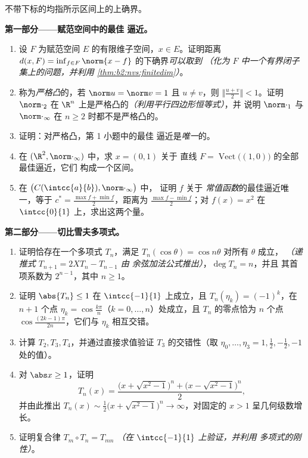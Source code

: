 \begin{problem}
\label{pb:b2:nvs:1}
不带下标的均指所示区间上的上确界。

\medskip
\noindent\textbf{第一部分——赋范空间中的最佳
逼近。}
\begin{enumerate}
  \item 设 $F$ 为赋范空间
        $E$ 的有限维子空间，$x \in E$。证明距离 $d(x,
        F) = \inf_{f \in F}\norm{x - f}$ 的下确界\emph{可以取到}
        \emph{（化为 $F$ 中一个有界闭子集上的问题，并利用
        \cref{thm:b2:nvs:finitedim}）}。
  \item 称为\emph{严格凸}的，若 $\norm u = \norm v
        = 1$ 且 $u \neq v$，则 $\bigl\Vert\frac{u +
        v}2\bigr\Vert < 1$。证明 $\norm\cdot_2$ 在 $\R^n$
        上是严格凸的\emph{（利用平行四边形恒等式）}，并
        说明 $\norm\cdot_1$ 与 $\norm\cdot_\infty$ 在
        $n \geq 2$ 时都不是严格凸的。
  \item 证明：对严格凸，第 1 小题中的最佳
        逼近是\emph{唯一}的。
  \item 在 $(\R^2, \norm\cdot_\infty)$ 中，求 $x = (0, 1)$ 关于
        直线 $F =
        \operatorname{Vect}\bigl((1,0)\bigr)$ 的全部最佳逼近，它们
        构成一个区间。
  \item 在 $\bigl(C(\intcc{a}{b}), \norm\cdot_\infty\bigr)$ 中，
        证明 $f$ 关于
        \emph{常值函数}的最佳逼近唯一，等于 $c^* = \frac{\max f
        + \min f}{2}$，距离为 $\frac{\max f - \min
        f}{2}$；对 $f(x) = x^2$ 在
        $\intcc{0}{1}$ 上，求出这两个量。
\end{enumerate}

\medskip
\noindent\textbf{第二部分——切比雪夫多项式。}
\begin{enumerate}[resume]
  \item 证明恰存在一个多项式 $T_n$，满足
        $T_n(\cos\theta) = \cos n\theta$ 对所有 $\theta$ 成立，
        \emph{（递推式 $T_{n+1} = 2XT_n - T_{n-1}$ 由
        余弦加法公式推出）}，$\deg T_n = n$，并且
        其首项系数为 $2^{n-1}$，其中 $n \geq 1$。
  \item 证明 $\abs{T_n} \leq 1$ 在 $\intcc{-1}{1}$ 上成立，且
        $T_n(\eta_k) = (-1)^k$，在 $n + 1$ 个点 $\eta_k =
        \cos\frac{k\pi}{n}$（$k = 0, \dots, n$）处成立，且
        $T_n$ 的零点恰为 $n$ 个点
        $\cos\frac{(2k-1)\pi}{2n}$，它们与 $\eta_k$ 相互交错。
  \item 计算 $T_2, T_3, T_4$，并通过直接求值验证
        $T_3$ 的交错性（取 $\eta_0, \dots, \eta_3 = 1, \frac12, -\frac12,
        -1$ 处的值）。
  \item 对 $\abs x \geq 1$，证明
        \[
        T_n(x) = \frac{\bigl(x + \sqrt{x^2 - 1}\bigr)^n +
        \bigl(x - \sqrt{x^2 - 1}\bigr)^n}{2},
        \]
        并由此推出 $T_n(x) \sim \frac12\bigl(x + \sqrt{x^2 -
        1}\bigr)^n \to \infty$，对固定的 $x > 1$ 呈几何级数增长。
  \item 证明复合律 $T_m \circ T_n = T_{mn}$
        \emph{（在 $\intcc{-1}{1}$ 上验证，并利用
        多项式的刚性）}。
\end{enumerate}


\end{problem}

